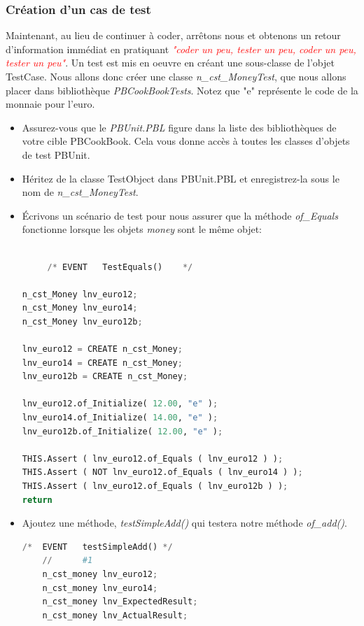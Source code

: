 \documentclass[a4paper,11pt,french]{report}
\theoremstyle{definition}
\begin{document}
\subsubsection{Création d'un cas de test}
Maintenant, au lieu de continuer à coder, arrêtons nous et obtenons un retour d'information immédiat en pratiquant 
\textit{\textcolor{red}{"coder un peu, tester un peu, coder un peu, tester un peu"}}.
Un test est mis en oeuvre  en créant une sous-classe de l'objet TestCase.
Nous allons donc créer une classe \textit{n\_cst\_MoneyTest}, que nous allons  placer dans bibliothèque  \textit{PBCookBookTests}.  
Notez que "e" représente le code de la monnaie pour l'euro.
\begin{itemize}
    \item Assurez-vous que le \textit{PBUnit.PBL} figure dans la liste des bibliothèques de votre cible PBCookBook. 
     Cela vous donne accès à toutes les classes d'objets de test PBUnit.
    \item Héritez de la classe TestObject dans PBUnit.PBL et enregistrez-la sous le nom de \textit{n\_cst\_MoneyTest}.
    \item Écrivons un scénario de test pour nous assurer que la méthode \textit{of\_Equals} fonctionne lorsque les objets \textit{money} sont le même objet:
  
 \begin{lstlisting}[language=Python, caption=Test d'égalité de deux \textit{money}]

     /*	EVENT	TestEquals()	*/

n_cst_Money	lnv_euro12;
n_cst_Money	lnv_euro14;
n_cst_Money	lnv_euro12b;

lnv_euro12 = CREATE n_cst_Money;
lnv_euro14 = CREATE n_cst_Money;
lnv_euro12b = CREATE n_cst_Money;

lnv_euro12.of_Initialize( 12.00, "e" );
lnv_euro14.of_Initialize( 14.00, "e" );
lnv_euro12b.of_Initialize( 12.00, "e" );

THIS.Assert ( lnv_euro12.of_Equals ( lnv_euro12 ) );
THIS.Assert ( NOT lnv_euro12.of_Equals ( lnv_euro14 ) );
THIS.Assert ( lnv_euro12.of_Equals ( lnv_euro12b ) );
return
\end{lstlisting}
\item Ajoutez une méthode, \textit{testSimpleAdd()} qui testera notre méthode  \textit{of\_add()}.

\begin{lstlisting}[language=Python, caption=Test d'addition de deux \textit{money}]
    /*	EVENT	testSimpleAdd()	*/
    //		#1
    n_cst_money	lnv_euro12;
    n_cst_money	lnv_euro14;
    n_cst_money	lnv_ExpectedResult;
    n_cst_money	lnv_ActualResult;
    

\end{lstlisting}
\end{itemize}
\end{document}
